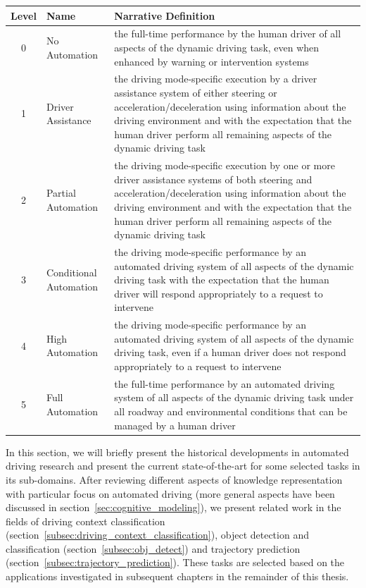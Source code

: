 \begin{center}
	\begin{tabular}{|c | l | p{10cm}|}
		\hline
		\textbf{Level} & \textbf{Name} & \textbf{Narrative Definition}\\ \hline
		0 & No Automation & the full-time performance by the human driver of all aspects of the dynamic driving task, even when enhanced by warning or intervention systems \\ \hline
		1 & Driver Assistance & the driving mode-specific execution by a driver assistance system of either steering or acceleration/deceleration using information about the driving environment and with the expectation that the human driver perform all remaining aspects of the dynamic driving task \\ \hline
		2 & Partial Automation & the driving mode-specific execution by one or more driver assistance systems of both steering and acceleration/deceleration using information	 about the driving environment and with the expectation that the human driver perform all remaining aspects of the dynamic driving task \\ \hline
		3 & Conditional Automation &  the driving mode-specific performance by an automated driving system of all aspects of the dynamic driving task with the expectation that the human driver will respond appropriately to a request to intervene \\ \hline
		4 & High Automation & the driving mode-specific performance by an automated driving system of all aspects of the dynamic driving task, even if a human driver does not respond appropriately to a request to intervene \\ \hline
		5 & Full Automation & the full-time performance by an automated driving system of all aspects of the dynamic driving task under all roadway and environmental conditions that can be managed by a human driver \\ \hline
	\end{tabular}
	\label{tab:autonomy_levels}
\end{center}

In this section, we will briefly present the historical developments in automated driving research and present the current state-of-the-art for some selected tasks in its sub-domains.
After reviewing different aspects of knowledge representation with particular focus on automated driving (more general aspects have been discussed in section~\ref{sec:cognitive_modeling}), we present related work in the fields of driving context classification (section~\ref{subsec:driving_context_classification}), object detection and classification (section~\ref{subsec:obj_detect}) and trajectory prediction (section~\ref{subsec:trajectory_prediction}). 
These tasks are selected based on the applications investigated in subsequent chapters in the remainder of this thesis.

